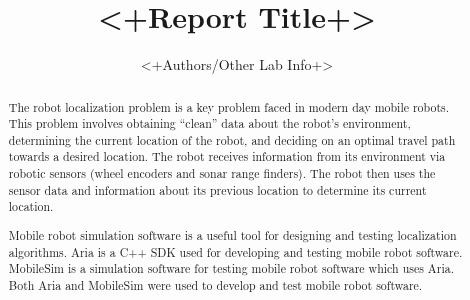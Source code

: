 \documentclass[a4paper,titlepage]{article}
\begin{document}
	\title{<+Report Title+>}
	\author{<+Authors/Other Lab Info+>}
	\maketitle

	\begin{abstract}

	The robot localization problem is a key problem faced in modern day mobile
	robots. This problem involves obtaining ``clean'' data about the robot's
	environment, determining the current location of the robot, and deciding on an
	optimal travel path towards a desired location. The robot receives information
	from its environment via robotic sensors (wheel encoders and sonar range
	finders). The robot then uses the sensor data and information about its
	previous location to determine its current location.

	Mobile robot simulation software is a useful tool for designing and testing
	localization algorithms. Aria is a C++ SDK used for developing and
	testing mobile robot software. MobileSim is a simulation software
	for testing mobile robot software which uses Aria. Both Aria and MobileSim
	were used to develop and test mobile robot software.
	
	\end{abstract}

	\tableofcontents
	\listoftables
	\listoffigures

	
	
	
	
\end{document}
